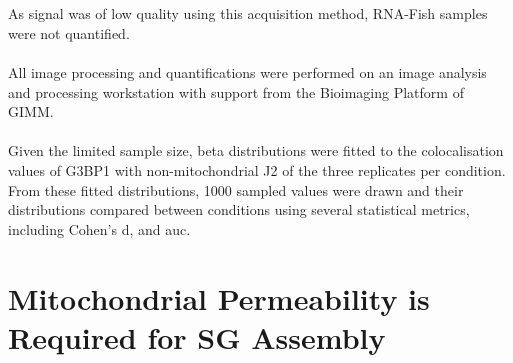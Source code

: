 \\
\\
As signal was of low quality using this acquisition method, RNA-Fish samples were not quantified. 
\\
\\
All image processing and quantifications were performed on an image analysis and processing workstation with support from the Bioimaging Platform of GIMM.
\\
\\
Given the limited sample size, beta distributions were fitted to the colocalisation values of G3BP1 with non-mitochondrial J2 of the three replicates per condition. From these fitted distributions, 1000 sampled values were drawn and their distributions compared between conditions using several statistical metrics, including Cohen's d, and \gls{auc}.

\section{Mitochondrial Permeability is Required for SG Assembly}


